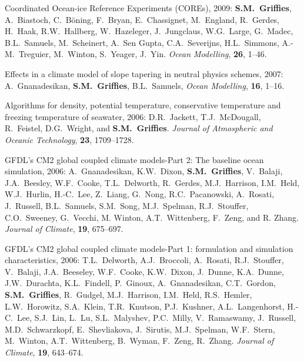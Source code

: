 \begin{etaremune}
\item Coordinated Ocean-ice Reference Experiments (COREs), 2009: {\bf
    S.M.\ Grif\/f\/ies}, A.\ Biastoch, C.\ B\"{o}ning, F.\ Bryan, E.\
  Chassignet, M.\ England, R.\ Gerdes, H.\ Haak, R.W.\ Hallberg, W.\
  Hazeleger, J.\ Jungclaus, W.G.\ Large, G.\ Madec, B.L.\ Samuels, M.\
  Scheinert, A.\ Sen Gupta, C.A.\ Severijns, H.L.\ Simmons, A.-M.\
  Treguier, M.\ Winton, S.\ Yeager, J.\ Yin.  {\em Ocean Modelling},
  {\bf 26}, 1--46.  

\item Effects in a climate model of slope tapering in neutral physics
schemes, 2007: A.\ Gnanadesikan, {\bf S.M.\ Grif\/f\/ies}, B.L.\
Samuels, {\em Ocean Modelling}, {\bf 16}, 1--16.
  
\item Algorithms for density, potential temperature, conservative
  temperature and freezing temperature of seawater, 2006: D.R.\
  Jackett, T.J.\ McDougall, R.\ Feistel, D.G.\ Wright, and {\bf S.M.\
    Grif\/f\/ies}.  {\em Journal of Atmospheric and Oceanic
    Technology}, {\bf 23}, 1709--1728.

\item GFDL's CM2 global coupled climate models-Part 2: The baseline
  ocean simulation, 2006: A.\ Gnanadesikan, K.W.\ Dixon, {\bf S.M.\
    Griffies}, V.\ Balaji, J.A.\ Beesley, W.F.\ Cooke, T.L.\ Delworth,
  R.\ Gerdes, M.J.\ Harrison, I.M.\ Held, W.J.\ Hurlin, H.-C.\ Lee,
  Z.\ Liang, G.\ Nong, R.C.\ Pacanowski, A.\ Rosati, J.\ Russell,
  B.L.\ Samuels, S.M.\ Song, M.J.\ Spelman, R.J.\ Stouffer, C.O.\
  Sweeney, G.\ Vecchi, M. Winton, A.T.\ Wittenberg, F.\ Zeng, and
  R. Zhang.  {\em Journal of Climate}, {\bf 19}, 675--697.

\item GFDL's CM2 global coupled climate models-Part 1: formulation and
  simulation characteristics, 2006: T.L.\ Delworth, A.J.\ Broccoli,
  A.\ Rosati, R.J.\ Stouffer, V.\ Balaji, J.A.\ Beeseley, W.F.\ Cooke,
  K.W.\ Dixon, J.\ Dunne, K.A.\ Dunne, J.W.\ Durachta, K.L.\ Findell,
  P.\ Ginoux, A.\ Gnanadesikan, C.T.\ Gordon, {\bf S.M.\ Griffies},
  R.\ Gudgel, M.J.\ Harrison, I.M.\ Held, R.S.\ Hemler, L.W.\
  Horowitz, S.A.\ Klein, T.R.\ Knutson, P.J.\ Kushner, A.L.\
  Langenhorst, H.-C.\ Lee, S.J.\ Lin, L.\ Lu, S.L.\ Malyshev, P.C.\
  Milly, V.\ Ramaswamy, J.\ Russell, M.D.\ Schwarzkopf, E.\
  Shevliakova, J.\ Sirutis, M.J.\ Spelman, W.F.\ Stern, M.\ Winton,
  A.T.\ Wittenberg, B.\ Wyman, F.\ Zeng, R.\ Zhang.  {\em Journal of
    Climate}, {\bf 19}, 643--674.


\end{etaremune}
